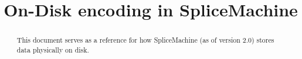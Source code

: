 \documentclass[10pt]{amsart}
\begin{document}
\title{On-Disk encoding in SpliceMachine}

\maketitle
\begin{abstract}
				This document serves as a reference for how SpliceMachine (as of version 2.0) stores data physically on disk. 
\end{abstract}


\end{document}
